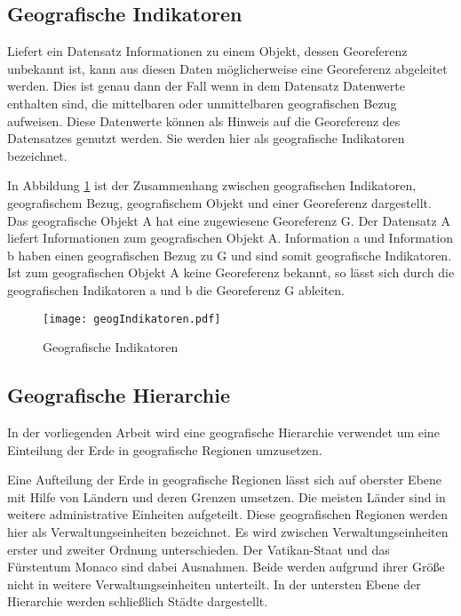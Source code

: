 		\subsection{Geografische Indikatoren}

			Liefert ein Datensatz Informationen zu einem Objekt, dessen Georeferenz unbekannt ist, kann aus diesen Daten möglicherweise eine Georeferenz abgeleitet werden. 
			Dies ist genau dann der Fall wenn in dem Datensatz Datenwerte enthalten sind, die mittelbaren oder unmittelbaren geografischen Bezug aufweisen.
			Diese Datenwerte können als Hinweis auf die Georeferenz des Datensatzes genutzt werden.
			Sie werden hier als geografische Indikatoren bezeichnet.

			In Abbildung \ref{img:geogIndi} ist der Zusammenhang zwischen geografischen Indikatoren, geografischem Bezug, geografischem Objekt und einer Georeferenz dargestellt. 
			Das geografische Objekt A hat eine zugewiesene Georeferenz G.
			Der Datensatz A liefert Informationen zum geografischen Objekt A.
			Information a und Information b haben einen geografischen Bezug zu G und sind somit geografische Indikatoren.
			Ist zum geografischen Objekt A keine Georeferenz bekannt, so lässt sich durch die geografischen Indikatoren a und b die Georeferenz G ableiten. 

			\begin{figure}[h!]
			\begin{center}
				\texttt{[image: geogIndikatoren.pdf]}
				\caption{Geografische Indikatoren}
				\label{img:geogIndi}
			\end{center}
			\end{figure}	

		\subsection{Geografische Hierarchie} \label{sub:geografischeHierarchie} 
			
			In der vorliegenden Arbeit wird eine geografische Hierarchie verwendet um eine Einteilung der Erde in geografische Regionen umzusetzen.

			Eine Aufteilung der Erde in geografische Regionen lässt sich auf oberster Ebene mit Hilfe von Ländern und deren Grenzen umsetzen. 
			Die meisten Länder sind in weitere administrative Einheiten aufgeteilt.
			Diese geografischen Regionen werden hier als Verwaltungseinheiten bezeichnet.
			Es wird zwischen Verwaltungseinheiten erster und zweiter Ordnung unterschieden. 
			Der Vatikan-Staat und das Fürstentum Monaco sind dabei Ausnahmen.
			Beide werden aufgrund ihrer Größe nicht in weitere Verwaltungseinheiten unterteilt.
			In der untersten Ebene der Hierarchie werden schließlich Städte dargestellt.


